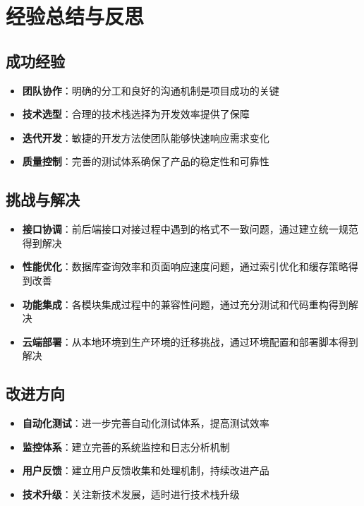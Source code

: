 \documentclass[a4paper]{article}
\begin{document}
\section{经验总结与反思}

\subsection{成功经验}

\begin{itemize}
    \item \textbf{团队协作}：明确的分工和良好的沟通机制是项目成功的关键
    \item \textbf{技术选型}：合理的技术栈选择为开发效率提供了保障
    \item \textbf{迭代开发}：敏捷的开发方法使团队能够快速响应需求变化
    \item \textbf{质量控制}：完善的测试体系确保了产品的稳定性和可靠性
\end{itemize}

\subsection{挑战与解决}

\begin{itemize}
    \item \textbf{接口协调}：前后端接口对接过程中遇到的格式不一致问题，通过建立统一规范得到解决
    \item \textbf{性能优化}：数据库查询效率和页面响应速度问题，通过索引优化和缓存策略得到改善
    \item \textbf{功能集成}：各模块集成过程中的兼容性问题，通过充分测试和代码重构得到解决
    \item \textbf{云端部署}：从本地环境到生产环境的迁移挑战，通过环境配置和部署脚本得到解决
\end{itemize}

\subsection{改进方向}

\begin{itemize}
    \item \textbf{自动化测试}：进一步完善自动化测试体系，提高测试效率
    \item \textbf{监控体系}：建立完善的系统监控和日志分析机制
    \item \textbf{用户反馈}：建立用户反馈收集和处理机制，持续改进产品
    \item \textbf{技术升级}：关注新技术发展，适时进行技术栈升级
\end{itemize}
\end{document}
